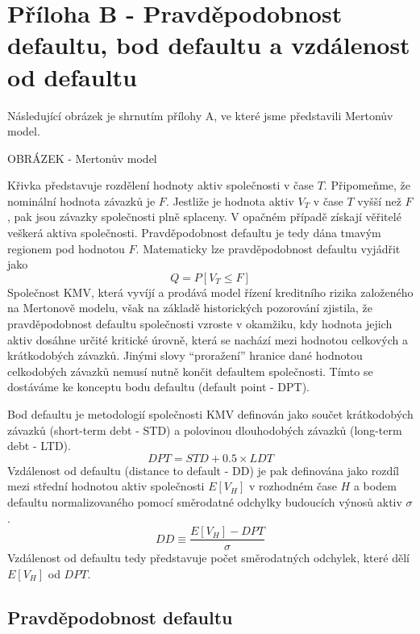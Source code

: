 \section[Příloha B - Pravděpodobnost defaultu]{Příloha B - Pravděpodobnost defaultu, bod defaultu a vzdálenost od defaultu}

Následující obrázek je shrnutím přílohy A, ve které jsme představili Mertonův model.

OBRÁZEK - Mertonův model

Křivka představuje rozdělení hodnoty aktiv společnosti v čase $T$. Připomeňme, že nominální hodnota závazků je $F$. Jestliže je hodnota aktiv $V_T$ v čase $T$ vyšší než $F$, pak jsou závazky společnosti plně splaceny. V opačném případě získají věřitelé veškerá aktiva společnosti. Pravděpodobnost defaultu je tedy dána tmavým regionem pod hodnotou $F$. Matematicky lze pravděpodobnost defaultu vyjádřit jako
\begin{equation}
Q = P[V_T \le F]
\end{equation}
Společnost KMV, která vyvíjí a prodává model řízení kreditního rizika založeného na Mertonově modelu, však na základě historických pozorování zjistila, že pravděpodobnost defaultu společnosti vzroste v okamžiku, kdy hodnota jejich aktiv dosáhne určité kritické úrovně, která se nachází mezi hodnotou celkových a krátkodobých závazků. Jinými slovy ``proražení'' hranice dané hodnotou celkodobých závazků nemusí nutně končit defaultem společnosti. Tímto se dostáváme ke konceptu bodu defaultu (default point - DPT).

Bod defaultu je metodologií společnosti KMV definován jako součet krátkodobých závazků (short-term debt - STD) a polovinou dlouhodobých závazků (long-term debt - LTD).
\begin{equation}
DPT = STD + 0.5 \times LDT
\end{equation}
Vzdálenost od defaultu (distance to default - DD) je pak definována jako rozdíl mezi střední hodnotou aktiv společnosti $E[V_H]$ v rozhodném čase $H$ a bodem defaultu normalizovaného pomocí směrodatné odchylky budoucích výnosů aktiv $\sigma$.
\begin{equation}
DD \equiv \frac{E[V_H] - DPT}{\sigma}
\end{equation}
Vzdálenost od defaultu tedy představuje počet směrodatných odchylek, které dělí $E[V_H]$ od $DPT$.

\subsection{Pravděpodobnost defaultu}


